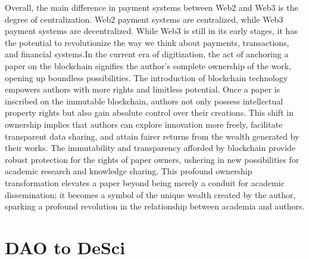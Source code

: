 \documentclass[lettersize,journal]{IEEEtran}
\begin{document}
Overall, the main difference in payment systems between Web2 and Web3 is the degree of centralization. Web2 payment systems are centralized, while Web3 payment systems are decentralized. While Web3 is still in its early stages, it has the potential to revolutionize the way we think about payments, transactions, and financial systems.In the current era of digitization, the act of anchoring a paper on the blockchain signifies the author's complete ownership of the work, opening up boundless possibilities. The introduction of blockchain technology empowers authors with more rights and limitless potential. Once a paper is inscribed on the immutable blockchain, authors not only possess intellectual property rights but also gain absolute control over their creations. This shift in ownership implies that authors can explore innovation more freely, facilitate transparent data sharing, and attain fairer returns from the wealth generated by their works. The immutability and transparency afforded by blockchain provide robust protection for the rights of paper owners, ushering in new possibilities for academic research and knowledge sharing. This profound ownership transformation elevates a paper beyond being merely a conduit for academic dissemination; it becomes a symbol of the unique wealth created by the author, sparking a profound revolution in the relationship between academia and authors.

  

\section{DAO to DeSci}

\end{document}
